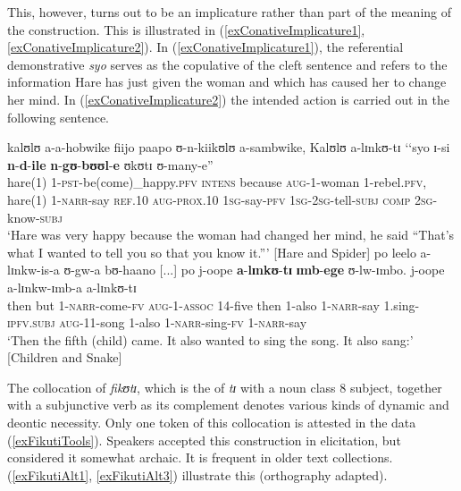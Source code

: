 This, however, turns out to be an implicature rather than part of the meaning of the construction. This is illustrated in (\ref{exConativeImplicature1}, \ref{exConativeImplicature2}). In (\ref{exConativeImplicature1}), the referential demonstrative \textit{syo} serves as the copulative of the cleft sentence and refers to the information Hare has just given the woman and which has caused her to change her mind. In (\ref{exConativeImplicature2}) the intended action is carried out in the following sentence.
\begin{exe}
\ex \label{exConativeImplicature1} \gll kalʊlʊ a-a-hobwike fiijo paapo ʊ-n-kiikʊlʊ a-sambwike, Kalʊlʊ a-lɪnkʊ-tɪ \textup{\lq\lq}syo ɪ-si \textbf{n}-\textbf{d}-\textbf{ile} \textbf{n}-\textbf{gʊ}-\textbf{bʊʊl}-\textbf{e} ʊkʊtɪ ʊ-many-e\textup{”}\\
hare(1) 1-\textsc{pst}-be(come)\_happy.\textsc{pfv} \textsc{intens} because \textsc{aug}-1-woman 1-rebel.\textsc{pfv}, hare(1) 1-\textsc{narr}-say \phantom{\lq\lq}\textsc{ref.10} \textsc{aug}-\textsc{prox.10} \textsc{1sg}-say-\textsc{pfv} \textsc{1sg}-\textsc{2sg}-tell-\textsc{subj} \textsc{comp} \textsc{2sg}-know-\textsc{subj} \\
\glt `Hare was very happy because the woman had changed her mind, he said ``That's what I wanted to tell you so that you know it.''{}' [Hare and Spider]
\ex \label{exConativeImplicature2} \gll po leelo a-lɪnkw-is-a ʊ-gw-a bʊ-haano [...] po j-oope \textbf{a}-\textbf{lɪnkʊ}-\textbf{tɪ} \textbf{ɪmb}-\textbf{ege} ʊ-lw-ɪmbo. j-oope a-lɪnkw-ɪmb-a a-lɪnkʊ-tɪ\\
then but 1-\textsc{narr}-come-\textsc{fv} \textsc{aug}-1-\textsc{assoc} 14-five {} then 1-also 1-\textsc{narr}-say 1.sing-\textsc{ipfv.subj} \textsc{aug}-11-song 1-also 1-\textsc{narr}-sing-\textsc{fv} 1-\textsc{narr}-say\\
\glt \lq Then the fifth (child) came. It also wanted to sing the song. It also sang:' [Children and Snake]
\end{exe}
The collocation of \textit{fikʊtɪ}, which is the  of \textit{tɪ} with a noun class 8 subject, together with a subjunctive verb as its complement denotes various kinds of dynamic and deontic necessity. Only one token of this collocation is attested in the data (\ref{exFikutiTools}). Speakers accepted this construction in elicitation, but considered it somewhat archaic. It is frequent in older text collections. (\ref{exFikutiAlt1}, \ref{exFikutiAlt3}) illustrate this (orthography adapted).


